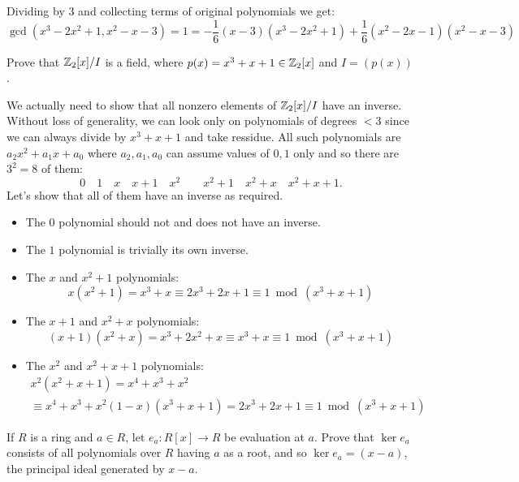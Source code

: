 \begin{myenumerate}
Dividing by $3$ and collecting terms of original polynomials we get:
\begin{equation*}
\gcd(x^3-2x^2+1, x^2-x-3) = 1 =
   -\frac{1}{6}(x-3)(x^3-2x^2+1) + \frac{1}{6}(x^2-2x-1)(x^2-x-3)
\end{equation*}

\item
\begin{excopy}
Prove that \(\mathbb{Z}_2[x]/I\) is a field, where \(p(x)=x^3+x+1\in\mathbb{Z}_2[x]\)
and \(I=(p(x))\).
\end{excopy}

We actually need to show that all nonzero elements of \(\mathbb{Z}_2[x]/I\)
have an inverse.
Without loss of generality, we can look only on polynomials
of degrees \(<3\) since we can always divide by \(x^3+x+1\)
and take ressidue.
All such  polynomials are \(a_2x^2+a_1x+a_0\)
where \(a_2,a_1,a_0\) can assume values of \(0,1\) only
and so there are \(3^2=8\) of them:
\[0 \quad 1 \quad
  x \quad x+1 \quad
  x^2 \qquad x^2+1 \quad x^2+x \quad x^2+x+1.\]
Let's show that all of them have an inverse as required.
\begin{itemize}

\item The $0$ polynomial should not and does not have an inverse.
\item The $1$ polynomial is trivially its own inverse.
\item The $x$ and \(x^2+1\) polynomials:
  \[  x(x^2+1) = x^3 +x \equiv 2x^3 + 2x + 1 \equiv 1 \bmod (x^3+x+1) \]
\item The \(x+1\) and \(x^2+x\) polynomials:
  \[  (x+1)(x^2+x) = x^3 + 2x^2 + x \equiv x^3 + x \equiv 1 \bmod (x^3+x+1) \]
\item The \(x^2\) and \(x^2+x+1\) polynomials:
\begin{multline*}
   x^2(x^2+x+1) = x^4 + x^3 + x^2 \\
      \equiv x^4 + x^3 + x^2 (1-x)(x^3+x+1)
      = 2x^3+2x+1 \equiv  1 \bmod (x^3+x+1)
\end{multline*}
\end{itemize}


\item
\begin{excopy}
If $R$ is a ring and \(a \in R\), let \(e_a:R[x]\rightarrow R\)
be evaluation at $a$.
Prove that \(\ker e_a\) consists of all polynomials over $R$ having $a$ as
a root, and so \(\ker e_a=(x-a)\), the principal ideal generated
by \(x-a\).
\end{excopy}


\end{myenumerate}
